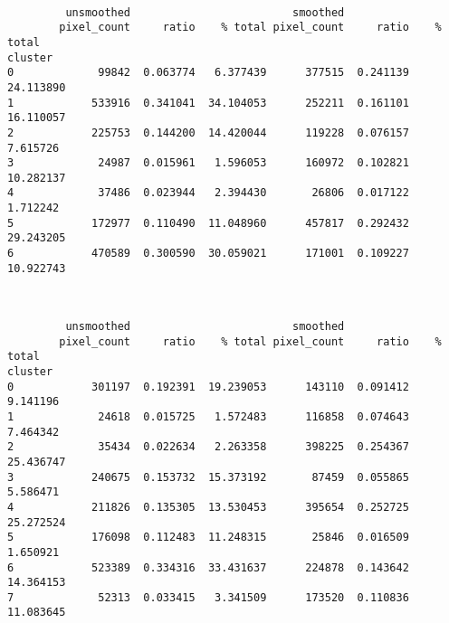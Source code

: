 \documentclass[11pt]{article}
\begin{document}
    
    \begin{center}
    \end{center}
    { \hspace*{\fill} \\}
    
    
    \begin{verbatim}
         unsmoothed                         smoothed                     
        pixel_count     ratio    % total pixel_count     ratio    % total
cluster                                                                  
0             99842  0.063774   6.377439      377515  0.241139  24.113890
1            533916  0.341041  34.104053      252211  0.161101  16.110057
2            225753  0.144200  14.420044      119228  0.076157   7.615726
3             24987  0.015961   1.596053      160972  0.102821  10.282137
4             37486  0.023944   2.394430       26806  0.017122   1.712242
5            172977  0.110490  11.048960      457817  0.292432  29.243205
6            470589  0.300590  30.059021      171001  0.109227  10.922743
    \end{verbatim}

    
    \begin{center}
    \end{center}
    { \hspace*{\fill} \\}
    
    
    \begin{verbatim}
         unsmoothed                         smoothed                     
        pixel_count     ratio    % total pixel_count     ratio    % total
cluster                                                                  
0            301197  0.192391  19.239053      143110  0.091412   9.141196
1             24618  0.015725   1.572483      116858  0.074643   7.464342
2             35434  0.022634   2.263358      398225  0.254367  25.436747
3            240675  0.153732  15.373192       87459  0.055865   5.586471
4            211826  0.135305  13.530453      395654  0.252725  25.272524
5            176098  0.112483  11.248315       25846  0.016509   1.650921
6            523389  0.334316  33.431637      224878  0.143642  14.364153
7             52313  0.033415   3.341509      173520  0.110836  11.083645
    \end{verbatim}

    
    \begin{center}
    \end{center}
    { \hspace*{\fill} \\}
    
\end{document}
